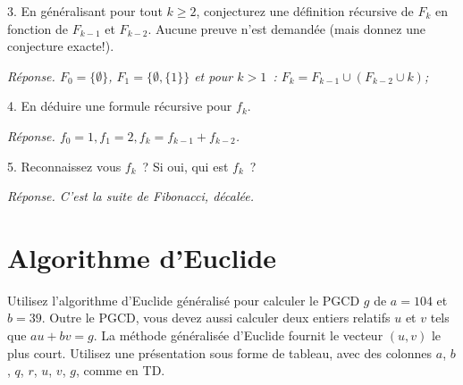 \documentclass[11pt]{article}
\begin{document}
{3.
En généralisant pour tout  $k\ge 2$, conjecturez une  définition récursive de $F_k$ en fonction de $F_{k-1}$ et $F_{k-2}$.
Aucune preuve n'est demandée (mais donnez une conjecture exacte!).


\ifcorrige

\medskip

{\it  Réponse.
$F_0= \{ \emptyset \}$, $F_1= \{ \emptyset, \{1\}\}$ et pour  $k>1$~:
$F_k= F_{k-1} \cup (F_{k-2}\cup k)$;
}
\medskip


\else
\fi

4. En déduire une formule récursive pour $f_k$.

\ifcorrige

\medskip

{\it  Réponse.
$f_0=1, f_1=2, f_k= f_{k-1} + f_{k-2}$.
}
\medskip


\else
\fi

5. Reconnaissez vous $f_k$~? Si oui, qui est $f_k$~?

\ifcorrige

\medskip

{\it  Réponse.
C'est la suite de Fibonacci, décalée.
}
\medskip


\else
\fi 
}

{
\section{Algorithme d'Euclide}
Utilisez  l'algorithme d'Euclide généralisé
pour calculer le PGCD $g$ de $a=104$ et $b=39$. Outre le PGCD, vous devez
aussi calculer deux entiers relatifs $u$ et $v$ tels que $a u + b v=g$.
La méthode généralisée d'Euclide fournit le vecteur $(u, v)$ le plus court. 
Utilisez une présentation sous forme de tableau, avec des colonnes $a$, $b$, $q$, $r$, $u$, $v$, $g$, comme en TD.
}
\end{document}
